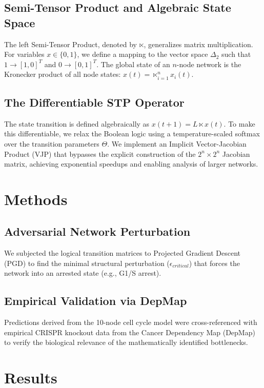 \documentclass[11pt,a4paper]{article}
\begin{document}
\subsection{Semi-Tensor Product and Algebraic State Space}
The left Semi-Tensor Product, denoted by $\ltimes$, generalizes matrix multiplication. For variables $x \in \{0, 1\}$, we define a mapping to the vector space $\Delta_2$ such that $1 \to [1, 0]^T$ and $0 \to [0, 1]^T$. The global state of an $n$-node network is the Kronecker product of all node states: $x(t) = \ltimes_{i=1}^n x_i(t)$.

\subsection{The Differentiable STP Operator}
The state transition is defined algebraically as $x(t+1) = L \ltimes x(t)$. To make this differentiable, we relax the Boolean logic using a temperature-scaled softmax over the transition parameters $\Theta$. We implement an Implicit Vector-Jacobian Product (VJP) that bypasses the explicit construction of the $2^n \times 2^n$ Jacobian matrix, achieving exponential speedups and enabling analysis of larger networks.

\section{Methods}
\subsection{Adversarial Network Perturbation}
We subjected the logical transition matrices to Projected Gradient Descent (PGD) to find the minimal structural perturbation ($\epsilon_{critical}$) that forces the network into an arrested state (e.g., G1/S arrest). 

\subsection{Empirical Validation via DepMap}
Predictions derived from the 10-node cell cycle model were cross-referenced with empirical CRISPR knockout data from the Cancer Dependency Map (DepMap) to verify the biological relevance of the mathematically identified bottlenecks.

\section{Results}
\end{document}
